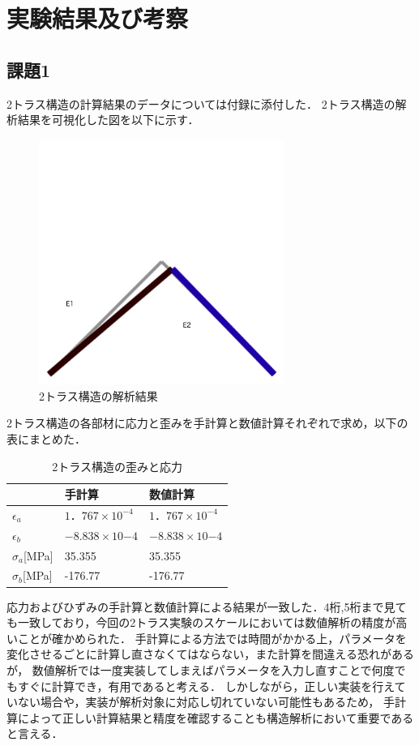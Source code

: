 \documentclass[a4paper,11pt,uplatex]{jsarticle}
\begin{document}
\section{実験結果及び考察}
\subsection{課題1}
2トラス構造の計算結果のデータについては付録に添付した．
2トラス構造の解析結果を可視化した図を以下に示す．
\begin{figure}[H]
  \begin{center}
    \includegraphics[width = 8cm]{画像/2.png}
    \caption{2トラス構造の解析結果}
    \label{2解析}
  \end{center}
\end{figure}

2トラス構造の各部材に応力と歪みを手計算と数値計算それぞれで求め，以下の表にまとめた．
\begin{table}[H]
\begin{center}
\caption{2トラス構造の歪みと応力}
\begin{tabular}{l|ll}
          & 手計算         & 数値計算        \\ \hline
$\epsilon_a$& $1．767 \times 10^{-4}$ & $1．767 \times 10^{-4}$   \\ \hline
$\epsilon_b$& $-8.838 \times 10{-4}$ & $-8.838 \times 10{-4}$ \\ \hline
$\sigma_a$[MPa]  & 35.355      & 35.355      \\ \hline
$\sigma_b$[MPa]& -176.77     & -176.77
\end{tabular}
\end{center}
\end{table}
応力およびひずみの手計算と数値計算による結果が一致した．4桁,5桁まで見ても一致しており，今回の2トラス実験のスケールにおいては数値解析の精度が高いことが確かめられた．
手計算による方法では時間がかかる上，パラメータを変化させるごとに計算し直さなくてはならない，また計算を間違える恐れがあるが，
数値解析では一度実装してしまえばパラメータを入力し直すことで何度でもすぐに計算でき，有用であると考える．
しかしながら，正しい実装を行えていない場合や，実装が解析対象に対応し切れていない可能性もあるため，
手計算によって正しい計算結果と精度を確認することも構造解析において重要であると言える．
\end{document}
